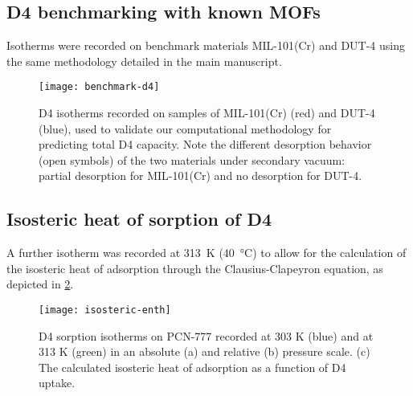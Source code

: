 \subsection{D4 benchmarking with known MOFs}\label{d4-benchmarking-with-known-mofs}

Isotherms were recorded on benchmark materials MIL-101(Cr) and DUT-4 using the
same methodology detailed in the main manuscript.

\begin{figure}[H]
    \centering
    \texttt{[image: benchmark-d4]}
    \caption{%
        D4 isotherms recorded on samples of MIL-101(Cr) (red) and
        DUT-4 (blue), used to validate our computational methodology for
        predicting total D4 capacity. Note the different desorption behavior
        (open symbols) of the two materials under secondary vacuum: partial
        desorption for MIL-101(Cr) and no desorption for DUT-4.
    }\label{fig:d4-benchmark}
\end{figure}

\subsection{Isosteric heat of sorption of D4}\label{isosteric-heat-of-sorption-of-d4}

A further isotherm was recorded at \SI{313}{\kelvin} (\SI{40}{\degreeCelsius})
to allow for the calculation of the isosteric heat of adsorption through the
Clausius-Clapeyron equation, as depicted in \cref{fig:isosteric-enth}.

\begin{figure}[H]
    \centering
    \texttt{[image: isosteric-enth]}
    \caption{%
        D4 sorption isotherms on PCN-777 recorded at 303 K (blue)
        and at 313 K (green) in an absolute (a) and relative (b) pressure scale.
        (c) The calculated isosteric heat of adsorption as a function of D4
        uptake.
    }\label{fig:isosteric-enth}
\end{figure}
